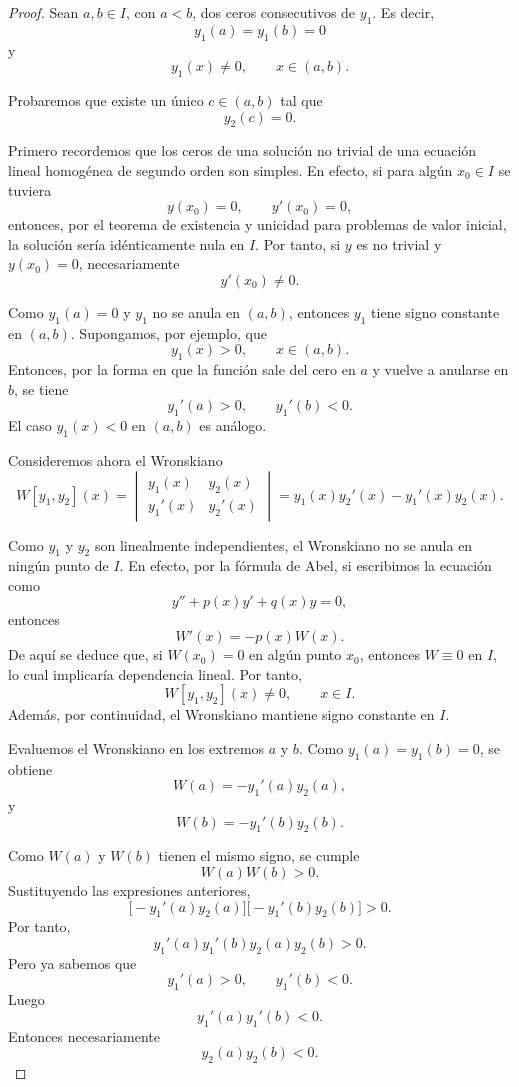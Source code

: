 \documentclass[12pt,a4paper]{article}
\theoremstyle{definition}
\begin{document}
\begin{proof}
Sean \(a,b\in I\), con \(a<b\), dos ceros consecutivos de \(y_1\). Es decir,
\[
y_1(a)=y_1(b)=0
\]
y
\[
y_1(x)\neq 0,\qquad x\in(a,b).
\]

Probaremos que existe un único \(c\in(a,b)\) tal que
\[
y_2(c)=0.
\]

Primero recordemos que los ceros de una solución no trivial de una ecuación lineal homogénea de segundo orden son simples. En efecto, si para algún \(x_0\in I\) se tuviera
\[
y(x_0)=0,\qquad y'(x_0)=0,
\]
entonces, por el teorema de existencia y unicidad para problemas de valor inicial, la solución sería idénticamente nula en \(I\). Por tanto, si \(y\) es no trivial y \(y(x_0)=0\), necesariamente
\[
y'(x_0)\neq 0.
\]

Como \(y_1(a)=0\) y \(y_1\) no se anula en \((a,b)\), entonces \(y_1\) tiene signo constante en \((a,b)\). Supongamos, por ejemplo, que
\[
y_1(x)>0,\qquad x\in(a,b).
\]
Entonces, por la forma en que la función sale del cero en \(a\) y vuelve a anularse en \(b\), se tiene
\[
y_1'(a)>0,\qquad y_1'(b)<0.
\]
El caso \(y_1(x)<0\) en \((a,b)\) es análogo.

Consideremos ahora el Wronskiano
\[
W[y_1,y_2](x)=
\begin{vmatrix}
y_1(x) & y_2(x)\\
y_1'(x) & y_2'(x)
\end{vmatrix}
=
y_1(x)y_2'(x)-y_1'(x)y_2(x).
\]

Como \(y_1\) y \(y_2\) son linealmente independientes, el Wronskiano no se anula en ningún punto de \(I\). En efecto, por la fórmula de Abel, si escribimos la ecuación como
\[
y''+p(x)y'+q(x)y=0,
\]
entonces
\[
W'(x)=-p(x)W(x).
\]
De aquí se deduce que, si \(W(x_0)=0\) en algún punto \(x_0\), entonces \(W\equiv 0\) en \(I\), lo cual implicaría dependencia lineal. Por tanto,
\[
W[y_1,y_2](x)\neq 0,\qquad x\in I.
\]
Además, por continuidad, el Wronskiano mantiene signo constante en \(I\).

Evaluemos el Wronskiano en los extremos \(a\) y \(b\). Como \(y_1(a)=y_1(b)=0\), se obtiene
\[
W(a)=-y_1'(a)y_2(a),
\]
y
\[
W(b)=-y_1'(b)y_2(b).
\]

Como \(W(a)\) y \(W(b)\) tienen el mismo signo, se cumple
\[
W(a)W(b)>0.
\]
Sustituyendo las expresiones anteriores,
\[
\bigl[-y_1'(a)y_2(a)\bigr]\bigl[-y_1'(b)y_2(b)\bigr]>0.
\]
Por tanto,
\[
y_1'(a)y_1'(b)y_2(a)y_2(b)>0.
\]
Pero ya sabemos que
\[
y_1'(a)>0,\qquad y_1'(b)<0.
\]
Luego
\[
y_1'(a)y_1'(b)<0.
\]
Entonces necesariamente
\[
y_2(a)y_2(b)<0.
\]


\end{proof}
\end{document}
